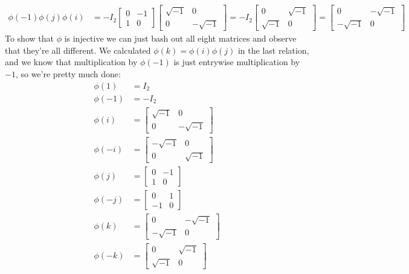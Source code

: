 \documentclass[]{article}
\begin{document}
\begin{enumerate}
\begin{enumerate}
\begin{align}
\phi(-1)\phi(j)\phi(i) &= -I_2\begin{bmatrix}0&-1\\1&0\end{bmatrix} \begin{bmatrix}\sqrt{-1}&0\\0&-\sqrt{-1}\end{bmatrix} = -I_2\begin{bmatrix}0&\sqrt{-1}\\\sqrt{-1}&0\end{bmatrix} = \begin{bmatrix}0&-\sqrt{-1}\\-\sqrt{-1}&0\end{bmatrix}
\end{align}
To show that $\phi$ is injective we can just bash out all eight matrices and observe that they're all different. We calculated $\phi(k) = \phi(i)\phi(j)$ in the last relation, and we know that multiplication by $\phi(-1)$ is just entrywise multiplication by $-1$, so we're pretty much done:
\begin{align}
\phi(1) &= I_2 \\
\phi(-1) &= -I_2 \\
\phi(i) &= \begin{bmatrix}\sqrt{-1}&0\\0&-\sqrt{-1}\end{bmatrix} \\
\phi(-i) &= \begin{bmatrix}-\sqrt{-1}&0\\0&\sqrt{-1}\end{bmatrix} \\
\phi(j) &= \begin{bmatrix}0&-1\\1&0\end{bmatrix} \\
\phi(-j) &= \begin{bmatrix}0&1\\-1&0\end{bmatrix} \\
\phi(k) &= \begin{bmatrix}0&-\sqrt{-1}\\-\sqrt{-1}&0\end{bmatrix} \\
\phi(-k) &= \begin{bmatrix}0&\sqrt{-1}\\\sqrt{-1}&0\end{bmatrix}
\end{align}
\end{enumerate}




\end{enumerate}
\end{document}
